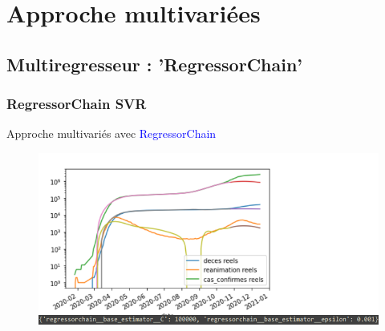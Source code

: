 \documentclass{beamer}[aspectratio = 43]
\begin{document}
\section{Approche multivariées}
\subsection{Multiregresseur : 'RegressorChain'}
\begin{frame}
	\frametitle{RegressorChain SVR}
	Approche multivariés avec \textcolor{blue}{RegressorChain}\\
	\begin{figure}[h]
		\includegraphics[scale=0.8]{mulitregr_epic_fail2}
	\end{figure}
\end{frame}
\end{document}
